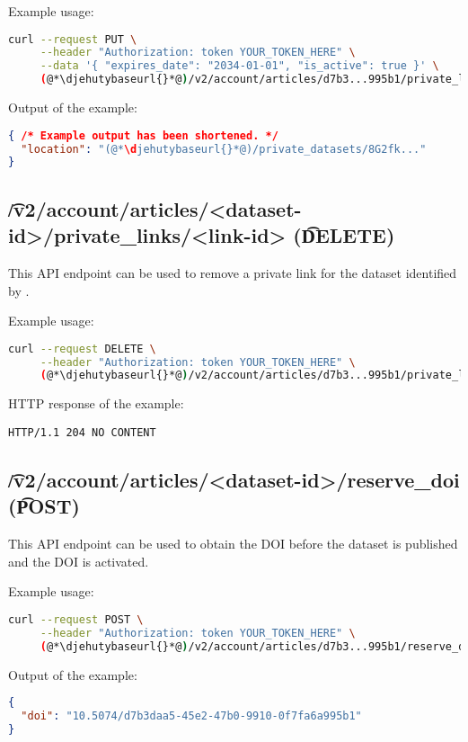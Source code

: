   Example usage:
\begin{lstlisting}[language=bash]
curl --request PUT \
     --header "Authorization: token YOUR_TOKEN_HERE" \
     --data '{ "expires_date": "2034-01-01", "is_active": true }' \
     (@*\djehutybaseurl{}*@)/v2/account/articles/d7b3...995b1/private_links/8G2fk... | jq
\end{lstlisting}

  Output of the example:
\begin{lstlisting}[language=JSON]
{ /* Example output has been shortened. */
  "location": "(@*\djehutybaseurl{}*@)/private_datasets/8G2fk..."
}
\end{lstlisting}

\subsection{\t{/v2/account/articles/<dataset-id>/private\_links/<link-id>} (\t{DELETE})}

  This API endpoint can be used to remove a private link for the dataset identified
  by \code{dataset-id}.

  Example usage:
\begin{lstlisting}[language=bash]
curl --request DELETE \
     --header "Authorization: token YOUR_TOKEN_HERE" \
     (@*\djehutybaseurl{}*@)/v2/account/articles/d7b3...995b1/private_links/8G2fk...
\end{lstlisting}

  HTTP response of the example:
\begin{lstlisting}
HTTP/1.1 204 NO CONTENT
\end{lstlisting}

\subsection{\t{/v2/account/articles/<dataset-id>/reserve\_doi} (\t{POST})}

  This API endpoint can be used to obtain the DOI before the dataset is
  published and the DOI is activated.

  Example usage:
\begin{lstlisting}[language=bash]
curl --request POST \
     --header "Authorization: token YOUR_TOKEN_HERE" \
     (@*\djehutybaseurl{}*@)/v2/account/articles/d7b3...995b1/reserve_doi | jq
\end{lstlisting}

  Output of the example:
\begin{lstlisting}[language=JSON]
{
  "doi": "10.5074/d7b3daa5-45e2-47b0-9910-0f7fa6a995b1"
}
\end{lstlisting}

